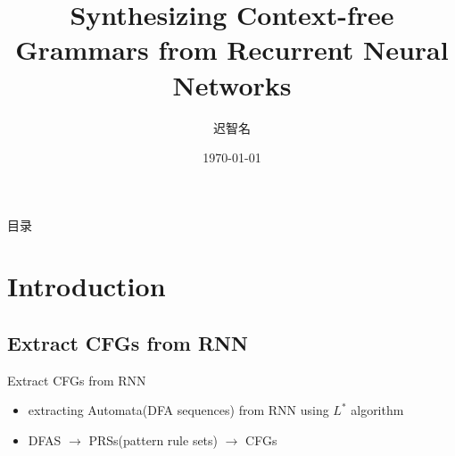 \documentclass[aspectratio=169%
,serif,mathserif]{beamer}
\begin{document}
\title[Synthesizing Context-free Grammars from Recurrent Neural Networks]{Synthesizing Context-free Grammars from Recurrent Neural Networks} %
\author[Chi~Zhiming]{迟智名} %
\institute[LZU] %
{	
}
	\CTEXoptions[today=old]
	\date{\today} %
\begin{frame}[plain]\vspace{1.5em}
\titlepage\vspace{-0.5cm}
\end{frame}
\begin{frame}{目录}
\tableofcontents
\end{frame}

\section{Introduction} %
\subsection{Extract CFGs from RNN}
\begin{frame}
	Extract CFGs from RNN
\begin{itemize}		
	\item extracting Automata(DFA sequences) from RNN using $L^*$ algorithm
	\item DFAS $\to$ PRSs(pattern rule sets) $\to$ CFGs  
\end{itemize}

\end{frame}
\end{document}
